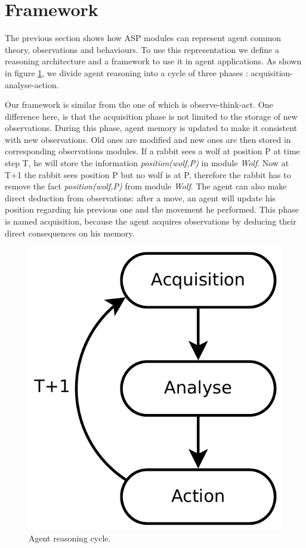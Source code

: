 \documentclass{aamas2012}
\begin{document}
\section{Framework}

	The previous section shows how ASP modules can represent agent common theory, observations and behaviours.
	To use this representation we define a reasoning architecture and a framework to use it in agent applications.
	As shown in figure \ref{framework_figure}, we divide agent reasoning into a cycle of three phases : acquisition-analyse-action.
	
	Our framework is similar from the one of \cite{DBLP:journals/amai/KowalskiS99} which is observe-think-act.
	One difference here, is that the acquisition phase is not limited to the storage of new observations.
	During this phase, agent memory is updated to make it consistent with new observations.
	Old ones are modified and new ones are then stored in corresponding observations modules.
	If a rabbit sees a wolf at position P at time step T, he will store the information \emph{position(wolf,P)} in module \emph{Wolf}.
	Now at T+1 the rabbit sees position P but no wolf is at P, therefore the rabbit has to remove the fact \emph{position(wolf,P)} from module \emph{Wolf}.
	The agent can also make direct deduction from observations: after a move, an agent will update his position regarding his previous one and the movement he performed.
	This phase is named acquisition, because the agent acquires observations by deducing their direct consequences on his memory.
	
	\begin{figure}
		\centering
		\includegraphics[keepaspectratio=true, scale=0.4]{framework.pdf}
		\caption
		{
			\label{framework_figure}
			Agent reasoning cycle.
		}
	\end{figure}
	
\end{document}
